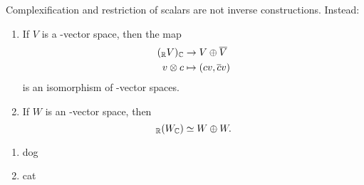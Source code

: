 \documentclass{scrartcl}
\begin{document}
Complexification and restriction of scalars are not inverse constructions. Instead:
\begin{proposition}
    \hfill
    \begin{enumerate}[font=\normalfont]
        \item If $V$ is a \CC-vector space, then the map \begin{align*}
            (_{\mathbb R} V)_{\mathbb C} &\rightarrow V \oplus \overline{V} \\
            v\otimes c &\mapsto (cv,\overline{c}v) \\
        \end{align*} is an isomorphism of \CC-vector spaces.
        \item If $W$ is an \RR-vector space, then \[_{\mathbb R}(W_{\mathbb C}) \simeq W\oplus W.\]
    \end{enumerate}
\end{proposition}

\begin{enumerate}
    \item dog
    \item cat
\end{enumerate}
\end{document}
